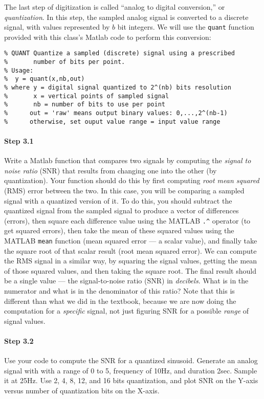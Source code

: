 The last step of digitization is called ``analog to digital
conversion,'' or \emph{quantization}. In this step, the sampled analog
signal is converted to a discrete signal, with values represented by
$b$ bit integers. We will use the \texttt{quant} function provided
with this class's Matlab code to perform this conversion:
\begin{verbatim}
% QUANT Quantize a sampled (discrete) signal using a prescribed
%       number of bits per point.
% Usage:
%  y = quant(x,nb,out)
% where y = digital signal quantized to 2^(nb) bits resolution
%       x = vertical points of sampled signal
%       nb = number of bits to use per point
%      out = 'raw' means output binary values: 0,...,2^(nb-1)
%      otherwise, set ouput value range = input value range
\end{verbatim}

\paragraph{Step 3.1} Write a Matlab function that compares two signals
by computing the \emph{signal to noise ratio} (SNR) that results from
changing one into the other (by quantization). Your function should do
this by first computing \emph{root mean squared} (RMS) error between
the two. In this case, you will be comparing a sampled signal with a
quantized version of it.  To do this, you should subtract the
quantized signal from the sampled signal to produce a vector of
differences (errors), then square each difference value using the
MATLAB \verb|.^| operator (to get squared errors), then take the mean
of these squared values using the MATLAB \verb|mean| function (mean
squared error --- a scalar value), and finally take the square root of
that scalar result (root mean squared error). We can compute the RMS
signal in a similar way, by squaring the signal values, getting the
mean of those squared values, and then taking the square root. The
final result should be a single value --- the signal-to-noise ratio
(SNR) in \emph{decibels}. What is in the numerator and what is in the
denominator of this ratio? Note that this is different than what we
did in the textbook, because we are now doing the computation for a
\emph{specific} signal, not just figuring SNR for a possible
\emph{range} of signal values.



  \paragraph{Step 3.2} Use your code to compute the SNR for a
  quantized sinusoid. Generate an analog signal with with a range of 0
  to 5, frequency of 10Hz, and duration 2sec. Sample it at 25Hz. Use
  2, 4, 8, 12, and 16 bits quantization, and plot SNR on the Y-axis
  versus number of quantization bits on the X-axis.

